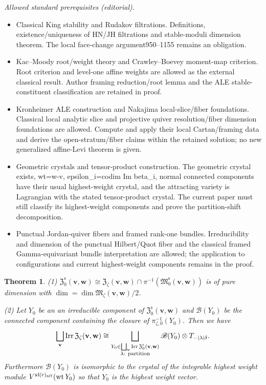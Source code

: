 \documentclass[10pt,a4paper]{amsart}
\newtheorem{Theorem}[equation]{Theorem}
\theoremstyle{definition}
\numberwithin{equation}{section}
\newcommand{\algsl}{\operatorname{\mathfrak{sl}}} %
\newcommand{\M}{{\mathfrak M}} %
\newcommand{\Mreg}{\M^{\operatorname{s}}}
\newcommand{\bv}{{\mathbf v}} %
\newcommand{\bw}{{\mathbf w}} %
\newcommand{\Irr}{\operatorname{Irr}}
\newcommand{\aff}{\mathrm{af\/f}}
\begin{document}
\noindent\textit{Allowed standard prerequisites (editorial).}\begin{itemize}
\item Classical King stability and Rudakov filtrations. Definitions, existence/uniqueness of HN/JH filtrations and stable-moduli dimension theorem. The local face-change argument950–1155 remains an obligation.
\item Kac–Moody root/weight theory and Crawley–Boevey moment-map criterion. Root criterion and level-one affine weights are allowed as the external classical result. Author framing reduction/root lemma and the ALE stable-constituent classification are retained in proof.
\item Kronheimer ALE construction and Nakajima local-slice/fiber foundations. Classical local analytic slice and projective quiver resolution/fiber dimension foundations are allowed. Compute and apply their local Cartan/framing data and derive the open-stratum/fiber claims within the retained solution; no new generalized affine-Levi theorem is given.
\item Geometric crystals and tensor-product construction. The geometric crystal exists, wt=w-v, epsilon\_i=codim Im beta\_i, normal connected components have their usual highest-weight crystal, and the attracting variety is Lagrangian with the stated tensor-product crystal. The current paper must still classify its highest-weight components and prove the partition-shift decomposition.
\item Punctual Jordan-quiver fibers and framed rank-one bundles. Irreducibility and dimension of the punctual Hilbert/Quot fiber and the classical framed Gamma-equivariant bundle interpretation are allowed; the application to configurations and current highest-weight components remains in the proof.
\end{itemize}\medskip
\begin{Theorem}\label{thm:MV}
  \textup{(1)} $\mathfrak Z_0^{\operatorname{s}}(\bv,\bw) \cong
  \mathfrak Z_\zeta(\bv,\bw)\cap\pi^{-1}(\Mreg_0(\bv,\bw))$ is of pure
  dimension with $\dim = \dim\M_\zeta(\bv,\bw)/2$.

  \textup{(2)} Let $Y_0$ be an an irreducible component of $\mathfrak
  Z_0^{\operatorname{s}}(\bv,\bw)$ and $\mathscr B(Y_0)$ be the
  connected component containing the closure of
  $\pi_{\zeta,0}^{-1}(Y_0)$. Then we have
  \begin{equation*}
   \bigsqcup_{\bv} \Irr\mathfrak Z_\zeta(\bv,\bw)
   \cong
   \bigsqcup_{\substack{Y_0\in\bigsqcup_{\bv} \Irr\mathfrak
       Z_0^{\operatorname{s}}(\bv,\bw) \\
       \text{\rm $\lambda$: partition}}}
     \mathscr B(Y_0)\otimes T_{-|\lambda|\delta}.
  \end{equation*}
  Furthermore $\mathscr B(Y_0)$ is isomorphic to the crystal of the
  integrable highest weight module
  $V^{\algsl(r)_\aff}\linebreak[2](\operatorname{wt} Y_0)$ so that $Y_0$ is the
  highest weight vector.
\end{Theorem}
\end{document}
